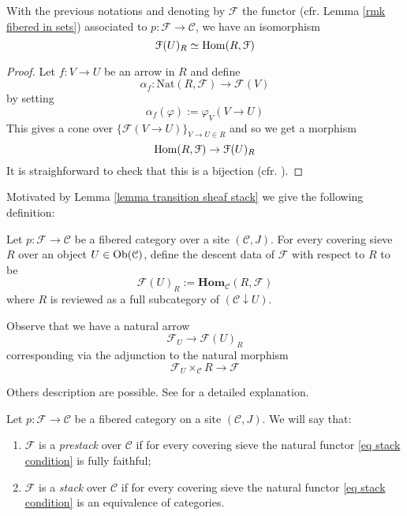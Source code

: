 \begin{refsection}
\begin{lemma} \label{lemma transition sheaf stack}
With the previous notations and denoting by $\mathcal F$ the functor (cfr. Lemma \ref{rmk fibered in sets}) associated to $p \colon \mathcal F \to \mathcal C$, we have an isomorphism
\[
\mathcal F(U)_R \simeq \mathrm{Hom}(R,\mathcal F)
\]
\end{lemma}

\begin{proof}
Let $f \colon V \to U$ be an arrow in $R$ and define
\[
\alpha_f \colon \mathrm{Nat}(R, \mathcal F) \to \mathcal F(V)
\]
by setting
\[
\alpha_f(\varphi) := \varphi_V(V \to U)
\]
This gives a cone over $\{\mathcal F(V \to U)\}_{V \to U \in R}$ and so we get a morphism
\[
\mathrm{Hom}(R,\mathcal F) \to \mathcal F(U)_R
\]
It is straighforward to check that this is a bijection (cfr. \cite[Prop. 2.39]{vistoli}).
\end{proof}

Motivated by Lemma \ref{lemma transition sheaf stack} we give the following definition:

\begin{defin}
Let $p \colon \mathcal F \to \mathcal C$ be a fibered category over a site $(\mathcal C,J)$. For every covering sieve $R$ over an object $U \in \operatorname{Ob}(\mathcal C)$, define the descent data of $\mathcal F$ with respect to $R$ to be
\[
\mathcal F(U)_R := \mathbf{Hom}_{\mathcal C}(R, \mathcal F)
\]
where $R$ is reviewed as a full subcategory of $(\mathcal C \downarrow U)$.
\end{defin}

Observe that we have a natural arrow
\begin{equation} \label{eq stack condition}
\mathcal F_U \to \mathcal F(U)_R
\end{equation}
corresponding via the adjunction to the natural morphism
\[
\mathcal F_U \times_{\mathcal C} R \to \mathcal F
\]

Others description are possible. See \cite[Ch. 4.1.2]{vistoli} for a detailed explanation.

\begin{defin} \label{def stack}
Let $p \colon \mathcal F \to \mathcal C$ be a fibered category on a site $(\mathcal C,J)$. We will say that:
\begin{enumerate}
\item $\mathcal F$ is a \emph{prestack} over $\mathcal C$ if for every covering sieve the natural functor \eqref{eq stack condition} is fully faithful;
\item $\mathcal F$ is a \emph{stack} over $\mathcal C$ if for every covering sieve the natural functor \eqref{eq stack condition} is an equivalence of categories.
\end{enumerate}
\end{defin}


\end{refsection}
